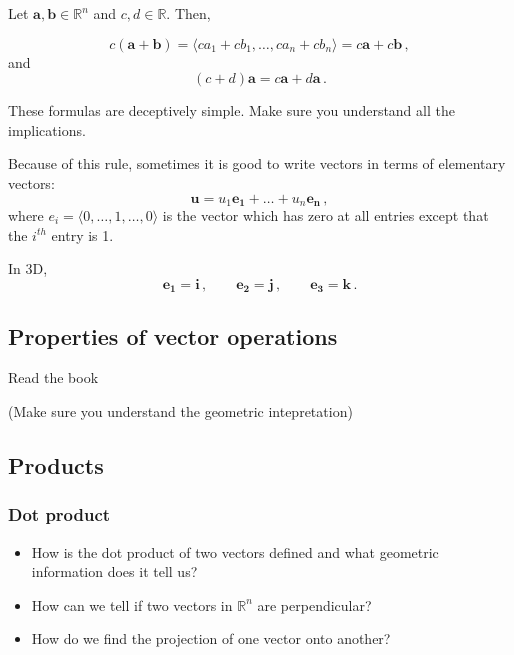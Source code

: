 \documentclass[
]{article}
\theoremstyle{definition}
\theoremstyle{definition}
\theoremstyle{definition}
\theoremstyle{definition}
\theoremstyle{remark}
\begin{document}
Let \(\textbf{a}, \textbf{b} \in \mathbb{R}^n\) and \(c,d \in \mathbb{R}\). Then,

\begin{equation*}
    c( \textbf{a} + \textbf{b}) = \langle c a_1 + c b_1, \dots, c a_n + c b_n \rangle  
    = c\textbf{a} + c\textbf{b} \,,
\end{equation*}
and
\begin{equation*}
 (c+d) \textbf{a} = c\mathbf{a} + d\mathbf{a} \,.
\end{equation*}

These formulas are deceptively simple. Make sure you understand all the implications.

Because of this rule, sometimes it is good to write vectors in terms of elementary vectors:
\begin{equation*}
    \mathbf{u} = u_1 \mathbf{e_1} + \dots + u_n \mathbf{e_n} \,,
\end{equation*}
where
\(e_i = \langle 0,\dots, 1, \dots, 0\rangle\) is the vector which has zero at all entries
except that the \(i^{th}\) entry is 1.

In 3D,
\begin{equation*}
    \mathbf{e_1} = \mathbf{i} \,, \qquad 
    \mathbf{e_2} = \mathbf{j} \,, \qquad
    \mathbf{e_3} = \mathbf{k} \,.
\end{equation*}

\hypertarget{properties-of-vector-operations}{%
\subsection*{Properties of vector operations}\label{properties-of-vector-operations}}

Read the book

(Make sure you understand the geometric intepretation)

\hypertarget{products}{%
\subsection{Products}\label{products}}

\hypertarget{dot-product}{%
\subsubsection{Dot product}\label{dot-product}}

\begin{itemize}
\item
  How is the dot product of two vectors defined and what geometric information does it tell us?
\item
  How can we tell if two vectors in \(\mathbb{R}^n\)
  are perpendicular?
\item
  How do we find the projection of one vector onto another?
\end{itemize}
\end{document}
